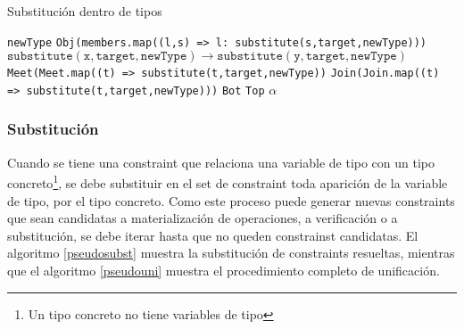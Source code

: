 \begin{algorithm}\captionsetup{labelsep=newline}
  \centering
  \caption{Substitución dentro de tipos}
  \label{pseudosubstitute}
    \begin{algorithmic}[1]
            \State \Return \texttt{newType}
          \EndIf
              \State \Return \texttt{Obj(members.map((l,s) => {l: substitute(s,target,newType)}))}
            \EndCase
              \State \Return $\mathtt{substitute(x,target,newType)\rightarrow substitute(y,target,newType)}$
            \EndCase
              \State \Return \texttt{Meet(Meet.map((t) => substitute(t,target,newType))}
            \EndCase
              \State \Return \texttt{Join(Join.map((t) => substitute(t,target,newType)))}
            \EndCase
              \State \Return \texttt{Bot}
            \EndCase
              \State \Return \texttt{Top}
            \EndCase
            \Case{$\alpha$}
              \State \Return $\alpha$
            \EndCase
          \EndSwitch
      \EndFunction
    \end{algorithmic}
\end{algorithm}

\subsubsection{Substitución}
Cuando se tiene una constraint que relaciona una variable de tipo con un tipo concreto\footnote{Un tipo concreto no tiene variables de tipo}, se debe substituir en el set de constraint toda aparición de la variable de tipo, por el tipo concreto. Como este proceso puede generar nuevas constraints que sean candidatas a materialización de operaciones, a verificación o a substitución, se debe iterar hasta que no queden constrainst candidatas. El algoritmo \ref{pseudosubst} muestra la substitución de constraints resueltas, mientras que el algoritmo \ref{pseudouni} muestra el procedimiento completo de unificación.

